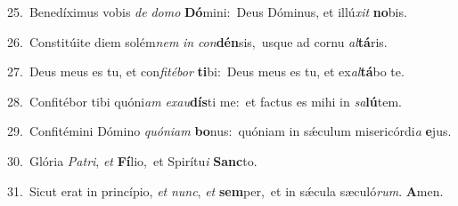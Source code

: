 {\numbfont\textcolor{\numbcolor}{25.}}~Benedíximus vobis \textit{de} \textit{do}\-\textit{mo} \textbf{Dó}\-mini:~\star Deus Dóminus, et illú\textit{xit} \textbf{no}\-bis.\par
{\numbfont\textcolor{\numbcolor}{26.}}~Constitúite diem solém\textit{nem} \textit{in} \textit{con}\-\textbf{dén}sis,~\star usque ad cornu \textit{al}\-\textbf{tá}ris.\par
{\numbfont\textcolor{\numbcolor}{27.}}~Deus meus es tu, et con\-\textit{fi}\-\textit{té}\textit{bor} \textbf{ti}\-bi:~\star Deus meus es tu, et ex\-\textit{al}\-\textbf{tá}bo te.\par
{\numbfont\textcolor{\numbcolor}{28.}}~Confitébor tibi quóni\textit{am} \textit{ex}\-\textit{au}\textbf{dís}ti me:~\star et factus es mihi in \textit{sa}\-\textbf{lú}tem.\par
{\numbfont\textcolor{\numbcolor}{29.}}~Confitémini Dómino \textit{quón}\-\textit{i}\textit{am} \textbf{bo}\-nus:~\star quóniam in sǽculum misericórdi\textit{a} \textbf{e}\-jus.\par
{\numbfont\textcolor{\numbcolor}{30.}}~Glória \textit{Pa}\-\textit{tri}, \textit{et} \textbf{Fí}\-lio,~\star et Spirítu\textit{i} \textbf{Sanc}\-to.\par
{\numbfont\textcolor{\numbcolor}{31.}}~Sicut erat in princípio, \textit{et} \textit{nunc}\-, \textit{et} \textbf{sem}\-per,~\star et in sǽcula sæculó\-\textit{rum}\-. \textbf{A}\-men.\par
